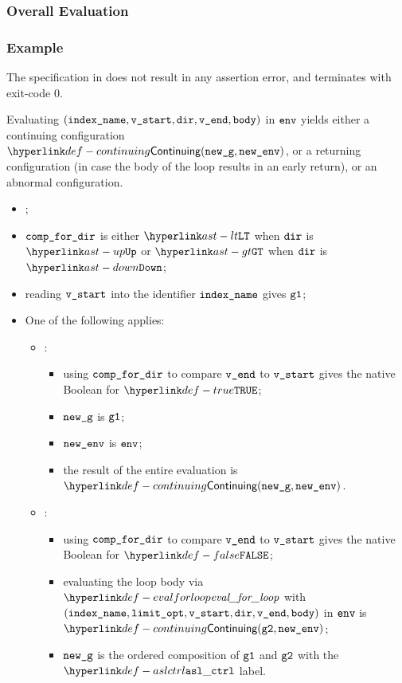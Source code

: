 \subsubsection{Overall Evaluation}
\subsubsection{Example}
The specification in 
does not result in any assertion error, and terminates with exit-code $0$.

Evaluating $(\texttt{index\_name}, \texttt{v\_start}, \texttt{dir}, \texttt{v\_end}, \texttt{body})$ in $\texttt{env}$ yields either
a continuing configuration $\Continuing(\newg, \newenv)$, or a returning configuration
(in case the body of the loop results in an early return),
or an abnormal configuration.

\AllApply
\begin{itemize}
  \item \Proseticklooplimit{$\vlimitopt$}{$\vnextlimitopt$}\ProseOrError;
  \item $\texttt{comp\_for\_dir}$ is either $\LT$ when $\texttt{dir}$ is $\UP$ or $\GT$ when $\texttt{dir}$ is $\DOWN$;
  \item reading $\texttt{v\_start}$ into the identifier $\texttt{index\_name}$ gives $\texttt{g1}$;
  \item One of the following applies:
    \begin{itemize}
    \item {}:
    \begin{itemize}
      \item using $\texttt{comp\_for\_dir}$ to compare $\texttt{v\_end}$ to $\texttt{v\_start}$ gives the native Boolean for $\True$;
      \item $\texttt{new\_g}$ is $\texttt{g1}$;
      \item $\texttt{new\_env}$ is $\texttt{env}$;
      \item the result of the entire evaluation is $\Continuing(\newg, \newenv)$.
    \end{itemize}
    \item {}:
    \begin{itemize}
      \item using $\texttt{comp\_for\_dir}$ to compare $\texttt{v\_end}$ to $\texttt{v\_start}$ gives the native Boolean for $\False$;
      \item evaluating the loop body via $\evalforloop$ with \\ $(\texttt{index\_name}, \texttt{limit\_opt}, \texttt{v\_start}, \texttt{dir}, \texttt{v\_end}, \texttt{body})$
      in $\texttt{env}$ is \\ $\Continuing(\vgtwo, \newenv)$\ProseTerminateAs{\ReturningConfig, \ThrowingConfig, \DynErrorConfig};
      \item $\texttt{new\_g}$ is the ordered composition of $\texttt{g1}$ and $\texttt{g2}$ with the $\aslctrl$ label.
    \end{itemize}
  \end{itemize}
\end{itemize}


